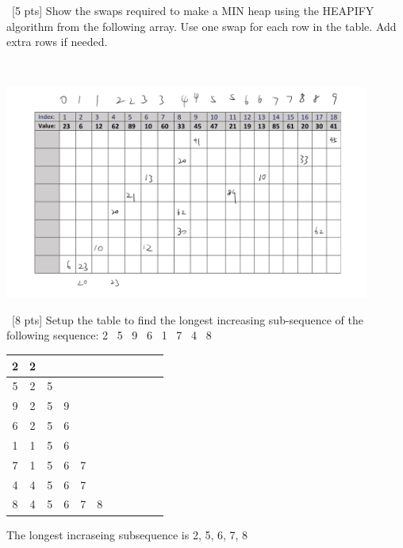 \documentclass[12pt]{article}
\newenvironment{sol}[1][Solution]{\begin{trivlist}\item[\hskip\labelsep {\bfseries #1:}]}{\end{trivlist}}
\begin{document}
\begin{enumerate}
    \item \ [5 pts] Show the swaps required to make a MIN heap using the HEAPIFY algorithm from the following array. Use one swap for each row in the table. Add extra rows if needed.
    \begin{sol}
    \hspace*{\fill}\\
            \begin{center}
        \includegraphics[width=0.9\textwidth]{p3.jpg}
    \end{center}
    \end{sol}

    \item \ [8 pts] Setup the table to find the longest increasing sub-sequence of the following sequence: 2 \ 5 \ 9 \ 6 \ 1 \ 7 \ 4 \ 8

    \begin{sol}
    \hspace*{\fill}
    \begin{center}
        \begin{tabular}{|c|c|c|c|c|c|c|c|c|c|c|}
        \hline
             2& 2& & & & & & & & & \\
                     \hline
             5& 2& 5 & & & & & & & & \\
                   \hline
             9& 2& 5 &9 & & & & & & & \\
                     \hline
             6& 2& 5& 6& & & & & & & \\
                     \hline
             1& 1& 5& 6& & & & & & & \\
                     \hline
             7& 1& 5& 6 &7 & & & & & & \\
                     \hline
             4& 4&5 &6 & 7& & & & & & \\
                     \hline
             8& 4& 5 & 6 &7 &8 & &  & & & \\
                     \hline
        \end{tabular}
    \end{center}
    The longest incraseing subsequence is 2, 5, 6, 7, 8 
    \end{sol}


\end{enumerate}
\end{document}
